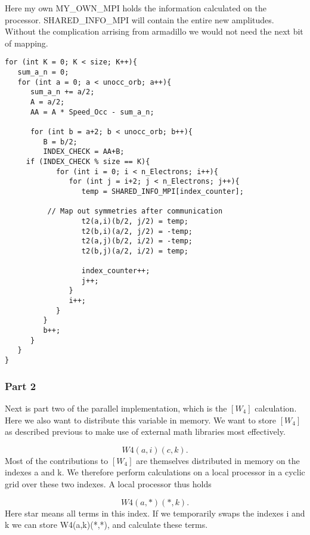\documentclass[a4paper,norsk,11pt,twoside]{report}
\begin{document}
Here my own MY\_OWN\_MPI holds the information calculated on the processor. SHARED\_INFO\_MPI will contain the entire new amplitudes. \\

Without the complication arrising from armadillo we would not need the next bit of mapping.

\begin{lstlisting}
for (int K = 0; K < size; K++){
   sum_a_n = 0;
   for (int a = 0; a < unocc_orb; a++){
      sum_a_n += a/2;
      A = a/2;
      AA = A * Speed_Occ - sum_a_n;

      for (int b = a+2; b < unocc_orb; b++){
         B = b/2;
         INDEX_CHECK = AA+B;
     if (INDEX_CHECK % size == K){
            for (int i = 0; i < n_Electrons; i++){
               for (int j = i+2; j < n_Electrons; j++){
                  temp = SHARED_INFO_MPI[index_counter];

          // Map out symmetries after communication
                  t2(a,i)(b/2, j/2) = temp;
                  t2(b,i)(a/2, j/2) = -temp;
                  t2(a,j)(b/2, i/2) = -temp;
                  t2(b,j)(a/2, i/2) = temp;

                  index_counter++;
                  j++;
               }
               i++;
            }
         }
         b++;
      }
   }
}
\end{lstlisting}

\subsubsection{Part 2}
Next is part two of the parallel implementation, which is the $[W_4]$ calculation. Here we also want to distribute this variable in memory. We want to store $[W_4]$ as described previous to make use of external math libraries most effectively.

\begin{equation}
W4(a,i)(c,k) .
\end{equation}
Most of the contributions to $[W_4]$ are themselves distributed in memory on the indexes a and k. We therefore perform calculations on a local processor in a cyclic grid over these two indexes. A local processor thus holds

\begin{equation}
W4(a,*)(*,k) .
\end{equation}
Here star means all terms in this index. If we temporarily swaps the indexes i and k we can store W4(a,k)(*,*), and calculate these terms.
\end{document}
